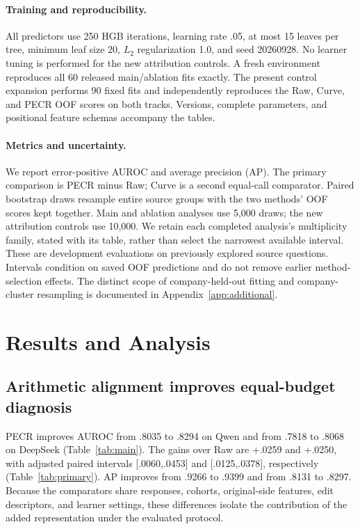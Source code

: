 \paragraph{Training and reproducibility.}
All predictors use 250 HGB iterations, learning rate .05, at most 15 leaves per tree, minimum leaf size 20, $L_2$ regularization 1.0, and seed 20260928. No learner tuning is performed for the new attribution controls. A fresh environment reproduces all 60 released main/ablation fits exactly. The present control expansion performs 90 fixed fits and independently reproduces the Raw, Curve, and PECR OOF scores on both tracks. Versions, complete parameters, and positional feature schemas accompany the tables.

\paragraph{Metrics and uncertainty.}
We report error-positive AUROC and average precision (AP). The primary comparison is PECR minus Raw; Curve is a second equal-call comparator. Paired bootstrap draws resample entire source groups with the two methods' OOF scores kept together. Main and ablation analyses use 5,000 draws; the new attribution controls use 10,000. We retain each completed analysis's multiplicity family, stated with its table, rather than select the narrowest available interval. These are development evaluations on previously explored source questions. Intervals condition on saved OOF predictions and do not remove earlier method-selection effects. The distinct scope of company-held-out fitting and company-cluster resampling is documented in Appendix~\ref{app:additional}.

\section{Results and Analysis}
\label{sec:results}


\subsection{Arithmetic alignment improves equal-budget diagnosis}
PECR improves AUROC from .8035 to .8294 on Qwen and from .7818 to .8068 on DeepSeek (Table~\ref{tab:main}). The gains over Raw are +.0259 and +.0250, with adjusted paired intervals [.0060,.0453] and [.0125,.0378], respectively (Table~\ref{tab:primary}). AP improves from .9266 to .9399 and from .8131 to .8297. Because the comparators share responses, cohorts, original-side features, edit descriptors, and learner settings, these differences isolate the contribution of the added representation under the evaluated protocol.

